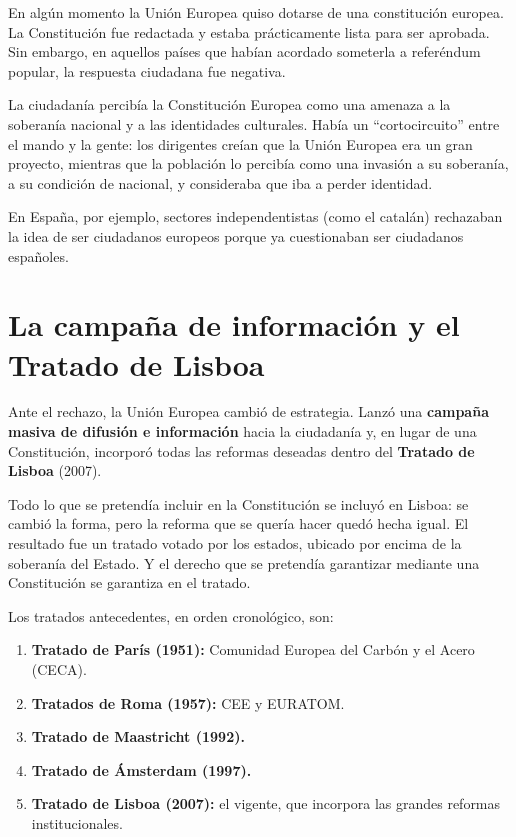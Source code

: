 \documentclass[12pt,oneside]{book}
\begin{document}
En algún momento la Unión Europea quiso dotarse de una constitución europea. La Constitución fue redactada y estaba prácticamente lista para ser aprobada. Sin embargo, en aquellos países que habían acordado someterla a referéndum popular, la respuesta ciudadana fue negativa.

La ciudadanía percibía la Constitución Europea como una amenaza a la soberanía nacional y a las identidades culturales. Había un ``cortocircuito'' entre el mando y la gente: los dirigentes creían que la Unión Europea era un gran proyecto, mientras que la población lo percibía como una invasión a su soberanía, a su condición de nacional, y consideraba que iba a perder identidad.

En España, por ejemplo, sectores independentistas (como el catalán) rechazaban la idea de ser ciudadanos europeos porque ya cuestionaban ser ciudadanos españoles.

\section{La campaña de información y el Tratado de Lisboa}

Ante el rechazo, la Unión Europea cambió de estrategia. Lanzó una \textbf{campaña masiva de difusión e información} hacia la ciudadanía y, en lugar de una Constitución, incorporó todas las reformas deseadas dentro del \textbf{Tratado de Lisboa} (2007).

Todo lo que se pretendía incluir en la Constitución se incluyó en Lisboa: se cambió la forma, pero la reforma que se quería hacer quedó hecha igual. El resultado fue un tratado votado por los estados, ubicado por encima de la soberanía del Estado. Y el derecho que se pretendía garantizar mediante una Constitución se garantiza en el tratado.

Los tratados antecedentes, en orden cronológico, son:

\begin{enumerate}
    \item \textbf{Tratado de París (1951):} Comunidad Europea del Carbón y el Acero (CECA).
    \item \textbf{Tratados de Roma (1957):} CEE y EURATOM.
    \item \textbf{Tratado de Maastricht (1992).}
    \item \textbf{Tratado de Ámsterdam (1997).}
    \item \textbf{Tratado de Lisboa (2007):} el vigente, que incorpora las grandes reformas institucionales.
\end{enumerate}
\end{document}
